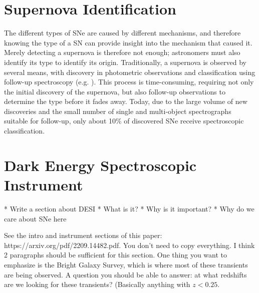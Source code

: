 \section{Supernova Identification}
\label{sec:supernova-identification}
The different types of SNe are caused by different mechanisms, and therefore 
knowing the type of a SN can provide insight into the mechanism that caused it.
Merely detecting a supernova is therefore not enough; astronomers must also identify its
type to identify its origin. Traditionally, a supernova is observed by several 
means, with discovery in photometric observations and classification using follow-up spectroscopy (e.g. \textcite{Perlmutter1999}). This process is time-consuming, requiring not only 
the initial discovery of the supernova, but also follow-up observations to determine
the type before it fades away. Today, due to the large volume of new discoveries and the small number of single and multi-object spectrographs suitable for follow-up, only about 10\% of discovered SNe receive spectroscopic classification.

\section{Dark Energy Spectroscopic Instrument}
\label{sec: DESI}
* Write a section about DESI
* What is it?
* Why is it important?
* Why do we care about SNe here

See the intro and instrument sections of this paper: https://arxiv.org/pdf/2209.14482.pdf. You don't need to copy everything. 
I think 2 paragraphs should be sufficient for this section. One thing you want to emphasize is the Bright Galaxy Survey, 
which is where most of these transients are being observed. A question you should be able to answer: at what redshifts 
are we looking for these transients? (Basically anything with $z<0.25$.




